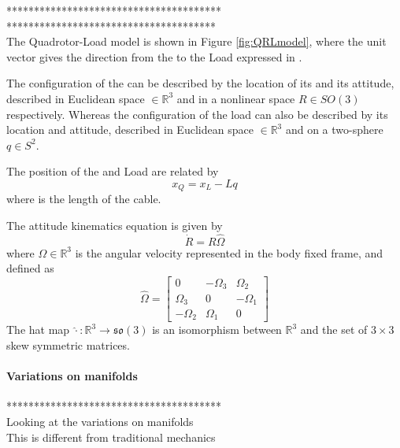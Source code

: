 ***************************************\\

**************************************\\

The Quadrotor-Load model is shown in Figure \ref{fig:QRLmodel}, where the unit vector  gives the direction from the  to the Load expressed in \BF.

The configuration of the  can be described by the location of its  and its attitude, described in Euclidean space $\in \mathbb{R}^3 $ and in a nonlinear space $R\in SO(3) $ respectively. Whereas the configuration of the load can also be described by its location and attitude, described in Euclidean space $\in \mathbb{R}^3 $ and on a two-sphere $ q\in S^2 $.

The position of the  and Load are related by
\begin{equation}\label{eq:xQ2xL}
x_Q=x_L-Lq
\end{equation}
where  is the length of the cable.

The attitude kinematics equation is given by
\begin{equation}\label{key}
\dot{R}=R\hat{\Omega}
\end{equation}
where $ \Omega\in\mathbb{R}^3 $ is the angular velocity represented in the body fixed frame, and defined as
\begin{equation}\label{key}
\hat{\Omega}=\begin{bmatrix}
0&-\Omega_3&\Omega_2\\
\Omega_3&0&-\Omega_1\\
-\Omega_2&\Omega_1&0
\end{bmatrix}
\end{equation}
The hat map $ \hat{\cdot}:\mathbb{R}^3\rightarrow \mathfrak{so}(3)$ is an isomorphism between $ \mathbb{R}^3 $ and the set of $ 3\times 3 $ skew symmetric matrices.

\paragraph{Variations on manifolds}

***************************************\\
Looking at the variations on manifolds\\
This is different from traditional mechanics

